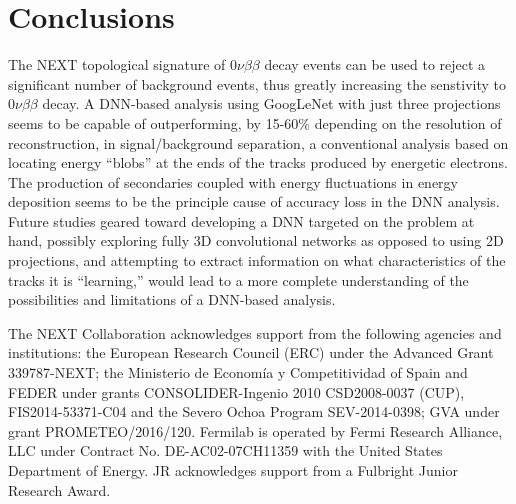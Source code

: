 \documentclass[a4paper,11pt]{article}
\begin{document}
\section{Conclusions}
The NEXT topological signature of $0\nu\beta\beta$ decay events can be used to reject a significant number of background events, thus greatly increasing the senstivity to $0\nu\beta\beta$ decay.  A DNN-based analysis using GoogLeNet with just three projections seems to be capable of outperforming, by 15-60\% depending on the resolution of reconstruction, in signal/background separation, a conventional analysis based on locating energy ``blobs'' at the ends of the tracks produced by energetic electrons.  The production of secondaries coupled with energy fluctuations in energy deposition seems to be the principle cause of accuracy loss in the DNN analysis.  Future studies geared toward developing a DNN targeted on the problem at hand, possibly exploring fully 3D convolutional networks as opposed to using 2D projections, and attempting to extract information on what characteristics of the tracks it is ``learning,'' would lead to a more complete understanding of the possibilities and limitations of a DNN-based analysis.

\acknowledgments

The NEXT Collaboration acknowledges support from the following agencies and institutions:
the European Research Council (ERC) under the Advanced Grant 339787-NEXT;
the Ministerio de Econom\'{i}a y Competitividad of Spain and FEDER under grants CONSOLIDER-Ingenio
2010 CSD2008-0037 (CUP), FIS2014-53371-C04 and the Severo Ochoa Program
SEV-2014-0398; GVA under grant PROMETEO/2016/120. Fermilab is operated by Fermi Research Alliance, LLC under Contract No. DE-AC02-07CH11359 with the United States Department of 
Energy. JR acknowledges support from a Fulbright Junior Research Award.


\end{document}
